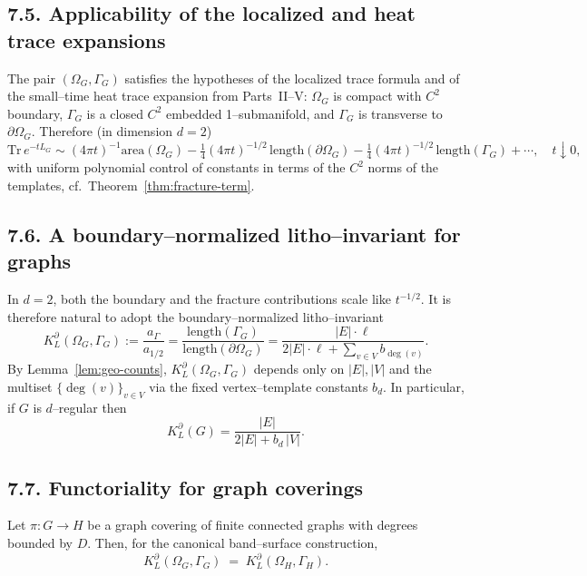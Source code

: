 \subsection*{7.5. Applicability of the localized and heat trace expansions}
The pair $(\Omega_G,\Gamma_G)$ satisfies the hypotheses of the localized trace formula and of the small–time heat trace expansion from Parts~II–V: $\Omega_G$ is compact with $C^2$ boundary, $\Gamma_G$ is a closed $C^2$ embedded 1–submanifold, and $\Gamma_G$ is transverse to $\partial\Omega_G$. Therefore (in dimension $d=2$)
\begin{equation}\label{eq:heat-2d}
\mathrm{Tr}\,e^{-tL_G}
\sim (4\pi t)^{-1}\mathrm{area}(\Omega_G)
-\tfrac14(4\pi t)^{-1/2}\,\mathrm{length}(\partial\Omega_G)
-\tfrac14(4\pi t)^{-1/2}\,\mathrm{length}(\Gamma_G)
+\cdots,\quad t\downarrow 0,
\end{equation}
with uniform polynomial control of constants in terms of the $C^2$ norms of the templates, cf.\ Theorem~\ref{thm:fracture-term}.

\subsection*{7.6. A boundary–normalized litho–invariant for graphs}
In $d=2$, both the boundary and the fracture contributions scale like $t^{-1/2}$. It is therefore natural to adopt the boundary–normalized litho–invariant
\[
K_L^\partial(\Omega_G,\Gamma_G)
:= \frac{a_\Gamma}{a_{1/2}}
= \frac{\mathrm{length}(\Gamma_G)}{\mathrm{length}(\partial\Omega_G)}
= \frac{|E|\cdot \ell}{2|E|\cdot \ell + \sum_{v\in V} b_{\deg(v)}}.
\]
By Lemma~\ref{lem:geo-counts}, $K_L^\partial(\Omega_G,\Gamma_G)$ depends only on $|E|,|V|$ and the multiset $\{\deg(v)\}_{v\in V}$ via the fixed vertex–template constants $b_d$. In particular, if $G$ is $d$–regular then
\begin{equation}\label{eq:KL-regular}
K_L^\partial(G)= \frac{|E|}{2|E| + b_d\, |V|}.
\end{equation}

\subsection*{7.7. Functoriality for graph coverings}
\begin{proposition}\label{prop:cover}
Let $\pi:G\to H$ be a graph covering of finite connected graphs with degrees bounded by $D$. Then, for the canonical band–surface construction,
\[
K_L^\partial(\Omega_G,\Gamma_G) \;=\; K_L^\partial(\Omega_H,\Gamma_H).
\]
\end{proposition}

